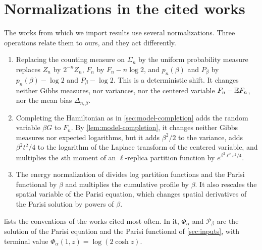 \section{Normalizations in the cited works}\label{sec:model-dictionary}

The works from which we import results use several normalizations. Three operations relate them to ours, and they act differently.
\begin{enumerate}[label=(\roman*)]
\item Replacing the counting measure on $\Sigma_n$ by the uniform probability measure replaces $Z_n$ by $2^{-n}Z_n$, $F_n$ by $F_n-n\log2$, and $p_n(\beta)$ and $P_\beta$ by $p_n(\beta)-\log2$ and $P_\beta-\log2$. This is a deterministic shift. It changes neither Gibbs measures, nor variances, nor the centered variable $F_n-\mathbb E F_n$, nor the mean bias $\Delta_{n,\beta}$.
\item Completing the Hamiltonian as in \cref{sec:model-completion} adds the random variable $\beta G$ to $F_n$. By \cref{lem:model-completion}, it changes neither Gibbs measures nor expected logarithms, but it adds $\beta^2/2$ to the variance, adds $\beta^2t^2/4$ to the logarithm of the Laplace transform of the centered variable, and multiplies the $s$th moment of an $\ell$-replica partition function by $e^{\beta^2\ell^2s^2/4}$.
\item The energy normalization of \cite[Section~7.1]{quantitative-parisi} divides log partition functions and the Parisi functional by $\beta$ and multiplies the cumulative profile by $\beta$. It also rescales the spatial variable of the Parisi equation, which changes spatial derivatives of the Parisi solution by powers of $\beta$.
\end{enumerate}
 lists the conventions of the works cited most often. In it, $\Phi_\alpha$ and $\mathcal P_\beta$ are the solution of the Parisi equation and the Parisi functional of \cref{sec:inputs}, with terminal value $\Phi_\alpha(1,z)=\log(2\cosh z)$.

